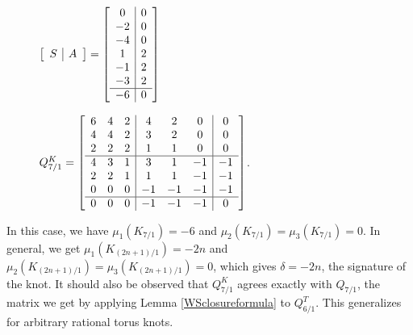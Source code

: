 \documentclass[11pt]{amsart}
\theoremstyle{plain}
\theoremstyle{definition}
\theoremstyle{remark}
\begin{document}
 \begin{figure}[H]
    \centering
\begin{minipage}[b]{.45\textwidth}

$\left[\begin{array}{ c| c }
   S & A \end{array}\right] =
  \left[\begin{array}{ c | c }
    0 & 0 \\
    -2 & 0\\
    -4 & 0\\
    1 & 2\\
    -1 & 2\\
    -3 & 2\\
    \hline
    -6 & 0\\ 
   
    \end{array}\right]$
    \end{minipage}
    \begin{minipage}[b]{.45\textwidth}
    $ Q_{7/1}^K=\left[\begin{array}{ c c c | c c c | c}
   
    6 & 4 & 2 & 4 & 2 & 0 & 0 \\
    4 & 4 & 2 & 3 & 2 & 0 & 0 \\
    2 & 2 & 2 & 1 & 1 & 0 & 0 \\
    \hline
    4 & 3 & 1 & 3 & 1 & -1 & -1\\
    2 & 2 & 1 & 1 & 1 & -1 & -1\\
    0 & 0 & 0 & -1 & -1 & -1 & -1\\
    \hline
    0 & 0 & 0 & -1 & -1 & -1 & 0\\ 
    \end{array}\right]$.
    \end{minipage}
\end{figure} 

In this case, we have $\mu_1(K_{7/1})=-6$ and $\mu_2(K_{7/1})=\mu_3(K_{7/1})=0$. In general, we get $\mu_1(K_{(2n+1)/1})=-2n$ and $\mu_2(K_{(2n+1)/1})=\mu_3(K_{(2n+1)/1})=0$, which gives $\delta=-2n$, the signature of the knot. It should also be observed that $Q_{7/1}^K$ agrees exactly with $Q_{7/1}$, the matrix we get by applying Lemma \ref{WSclosureformula} to $Q_{6/1}^T$. This generalizes for arbitrary rational torus knots.

\end{document}
